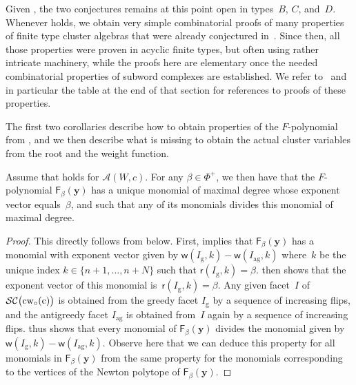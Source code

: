 \documentclass[ALCO,Unicode,ThmDefs]{cedram}
\newcommand{\Phiplus}{\Phi^+}
\newcommand{\y}{\mathbf{y}}
\newcommand{\Alg}{\mathcal{A}}
\newcommand{\subwordComplex}{\mathcal{SC}}
\newcommand{\clusterComplex}{\subwordComplex\big(\cw{c}\big)}
\newcommand{\greedy}{I_{\operatorname{g}}}
\newcommand{\antigreedy}{I_{\operatorname{ag}}}
\newcommand{\Fpoly}[2]{{\mathsf{F}_{#1}(#2)}}
\newcommand{\sq}[1]{{\rm #1}}
\newcommand{\sfr}{\mathsf{r}}
\newcommand{\sfw}{\mathsf{w}}
\newcommand{\wo}{{w_\circ}}
\newcommand{\sw}[2]{\sq{#1}(\sq{#2})}
\newcommand{\cwo}[1]{\sw{\wo}{#1}}
\newcommand{\cw}[1]{\sq{#1}\cwo{#1}}
\newcommand{\Root}[2]{{\sfr}(#1,#2)}
\newcommand{\Weight}[2]{{\sfw}(#1,#2)}
\begin{document}
Given , the two conjectures remains at this point open in types~$B$, $C$, and~$D$. Whenever  holds, we obtain very simple combinatorial proofs of many properties of finite type cluster algebras that were already conjectured in~\cite{FZ2007}. Since then, all those properties were proven in acyclic finite types, but often using rather intricate machinery, while the proofs here are elementary once the needed combinatorial properties of subword complexes are established. We refer to~\cite[Section~3.3]{RS2016} and in particular the table at the end of that section for references to proofs of these properties.


The first two corollaries describe how to obtain properties of the $F$-polynomial from , and we then describe what is missing to obtain the actual cluster variables from the root and the weight function.

\begin{coro}[{\cite[Conjecture~7.17]{FZ2007}}]\label{cor:dvector}
Assume that  holds for $\Alg(W,c)$. For any $\beta \in \Phiplus$, we then have that the $F$-polynomial $\Fpoly{\beta}{\y}$ has a unique monomial of maximal degree whose exponent vector equals~$\beta$, and such that any of its monomials divides this monomial of maximal degree.
\end{coro}

\begin{proof}
This directly follows from  below. First,  implies that $\Fpoly{\beta}{\y}$ has a monomial with exponent vector given by $\Weight{\greedy}{k} - \Weight{\antigreedy}{k}$ where~$k$ be the unique index $k \in \{n+1,\dots,n+N\}$ such that $\Root{\greedy}{k} = \beta$.  then shows that the exponent vector of this monomial is~$\Root{\greedy}{k} = \beta$. Any given facet~$I$ of $\clusterComplex$ is obtained from the greedy facet $\greedy$ by a sequence of increasing flips, and the antigreedy facet $\antigreedy$ is obtained from~$I$ again by a sequence of increasing flips.  thus shows that every monomial of $\Fpoly{\beta}{\y}$ divides the monomial given by $\Weight{\greedy}{k} - \Weight{\antigreedy}{k}$. Observe here that we can deduce this property for all monomials in $\Fpoly{\beta}{\y}$ from the same property for the monomials corresponding to the vertices of the Newton polytope of $\Fpoly{\beta}{\y}$.
\end{proof}
\end{document}
